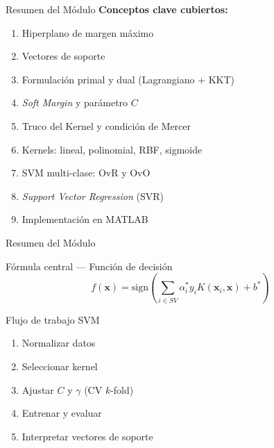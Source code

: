 \documentclass[aspectratio=169,xcolor=dvipsnames]{beamer}
\begin{document}
\begin{frame}{Resumen del Módulo}
        \textbf{Conceptos clave cubiertos:}
        \begin{enumerate}
            \footnotesize
            \item Hiperplano de margen máximo
            \item Vectores de soporte
            \item Formulación primal y dual (Lagrangiano + KKT)
            \item \textit{Soft Margin} y parámetro $C$
            \item Truco del Kernel y condición de Mercer
            \item Kernels: lineal, polinomial, RBF, sigmoide
            \item SVM multi-clase: OvR y OvO
            \item \textit{Support Vector Regression} (SVR)
            \item Implementación en MATLAB
        \end{enumerate}
    \end{frame}
    \begin{frame}{Resumen del Módulo}

        \begin{alertblock}{Fórmula central — Función de decisión}
            \begin{equation*}
                f(\mathbf{x}) = \text{sign}\!\left(\sum_{i \in SV} \alpha_i^* y_i K(\mathbf{x}_i, \mathbf{x}) + b^*\right)
            \end{equation*}
        \end{alertblock}
        \vspace{0.3em}
        \begin{block}{Flujo de trabajo SVM}
            \begin{enumerate}
                \item Normalizar datos
                \item Seleccionar kernel
                \item Ajustar $C$ y $\gamma$ (CV $k$-fold)
                \item Entrenar y evaluar
                \item Interpretar vectores de soporte
            \end{enumerate}
        \end{block}
\end{frame}
\end{document}
